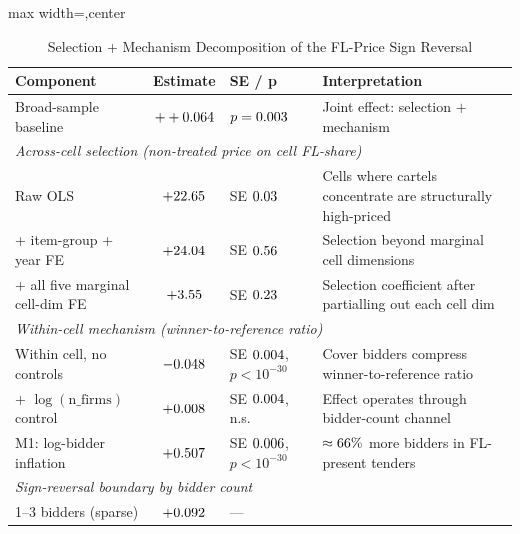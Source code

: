 \begin{table}[htbp]
\centering
\caption{Selection + Mechanism Decomposition of the FL-Price Sign Reversal}
\label{tab:sign_reversal_decomposition_submission}
\footnotesize
\begin{adjustbox}{max width=\textwidth,center}
\begin{threeparttable}
\begin{tabular}{p{4.8cm}cp{2.0cm}p{5.6cm}}
\toprule
Component & Estimate & SE / p & Interpretation \\
\midrule
Broad-sample baseline & $++0.064$ & $p=0.003$ &
  Joint effect: selection $+$ mechanism \\
\midrule
\multicolumn{4}{l}{\textit{Across-cell selection (non-treated price on cell FL-share)}} \\
\hspace{6pt} Raw OLS & $+22.65$ & SE $0.03$ &
  Cells where cartels concentrate are structurally high-priced \\
\hspace{6pt} + item-group + year FE & $+24.04$ & SE $0.56$ &
  Selection beyond marginal cell dimensions \\
\hspace{6pt} + all five marginal cell-dim FE & $+3.55$ &
  SE $0.23$ &
  Selection coefficient after partialling out each cell dim \\
\midrule
\multicolumn{4}{l}{\textit{Within-cell mechanism (winner-to-reference ratio)}} \\
\hspace{6pt} Within cell, no controls & $-0.048$ &
  SE $0.004$, $p<10^{-30}$ &
  Cover bidders compress winner-to-reference ratio \\
\hspace{6pt} + $\log(\text{n\_firms})$ control & $+0.008$ &
  SE $0.004$, n.s. &
  Effect operates through bidder-count channel \\
\hspace{6pt} M1: log-bidder inflation & $+0.507$ &
  SE $0.006$, $p<10^{-30}$ &
  $\approx 66\%$ more bidders in FL-present tenders \\
\midrule
\multicolumn{4}{l}{\textit{Sign-reversal boundary by bidder count}} \\
\hspace{6pt} 1--3 bidders (sparse) & $+0.092$ & --- &

\end{tabular}
\end{threeparttable}
\end{adjustbox}
\end{table}
